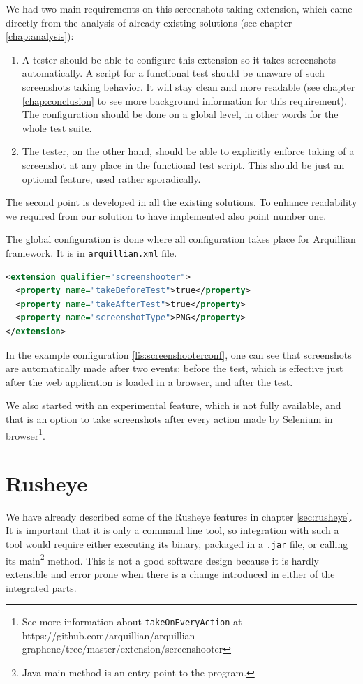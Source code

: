 \documentclass[11pt,oneside,final]{fithesis2}
\begin{document}
We had two main requirements on this screenshots taking extension, which came directly from the analysis of
already existing solutions (see chapter \ref{chap:analysis}):

\begin{enumerate}
 \item A tester should be able to configure this extension so it takes screenshots automatically. A script
 for a functional test should be unaware of such screenshots taking behavior. It will stay clean and more 
 readable (see chapter \ref{chap:conclusion} to see more background information for this requirement).
 The configuration should be done on a global level, in other words for the whole test suite.
 \item The tester, on the other hand, should be able to explicitly enforce taking of a screenshot at any place
 in the functional test script. This should be just an optional feature, used rather sporadically.
\end{enumerate}

The second point is developed in all the existing solutions. To enhance readability we required from our solution
to have implemented also point number one.

The global configuration is done where all configuration takes place for Arquillian framework. 
It is in \texttt{arquillian.xml} file.

\begin{lstlisting}[caption=Example of screenshooter configuration in arquillian.xml,label=lis:screenshooterconf,language=xml]
<extension qualifier="screenshooter">
  <property name="takeBeforeTest">true</property>
  <property name="takeAfterTest">true</property>
  <property name="screenshotType">PNG</property>
</extension>
\end{lstlisting}

In the example configuration \ref{lis:screenshooterconf}, one can see that screenshots are automatically 
made after two events: before the test, which is effective just after the web application is loaded in 
a browser, and after the test. 

We also started with an experimental feature, which is not fully available, and that is an option
to take screenshots after every action made by Selenium in browser\footnote{See more information 
about \texttt{takeOnEveryAction} at https://github.com/arquillian/arquillian-graphene/tree/master/extension/screenshooter}.
  
\section{Rusheye}
We have already described some of the Rusheye features in chapter \ref{sec:rusheye}. It is important that it
is only a command line tool, so integration with such a tool would require either executing its binary,
packaged in a \texttt{.jar} file, or calling its main\footnote{Java main method is an entry point
to the program.} method. This is not a good software design because it is hardly extensible and error prone
when there is a change introduced in either of the integrated parts.
\end{document}
